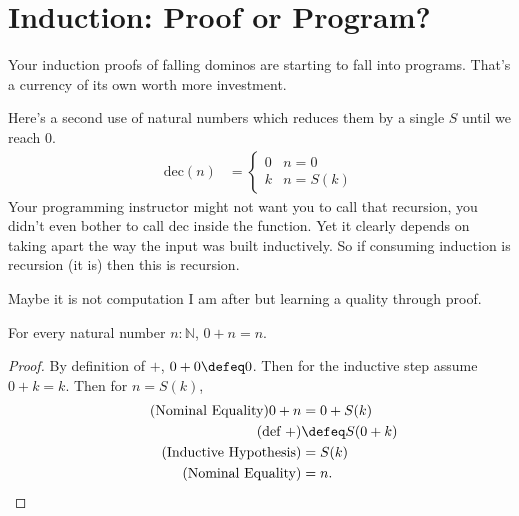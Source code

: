 

\section{Induction: Proof or Program?}
Your induction proofs of falling dominos are starting to fall into programs.
That's a currency of its own worth more investment.

Here's a second use of natural numbers which reduces them by a single $S$ until we reach $0$.
\begin{align*}
    \text{dec}(n) & =\begin{cases}
        0 & n=0\\
        k & n=S(k)
    \end{cases}
\end{align*}
Your programming instructor might not want you to call that recursion, you didn't 
even bother to call $\text{dec}$ inside the function.  Yet it clearly 
depends on taking apart the way the input was built inductively.  So if 
consuming induction is recursion (it is) then this is recursion.

Maybe it is not computation I am after but learning a quality through proof.

\begin{proposition}
    For every natural number $n:\mathbb{N}$, $0+n=n$.
\end{proposition}
\begin{proof}
    By definition of $+$, $0+0\defeq 0$.
    Then for the inductive step assume 
    $0+k=k$.  Then for $n=S(k)$, 
    \begin{align*}
        \tag{Nominal Equality}
        0+n & = 0+S(k)\\
        \tag{def $+$}
        & \defeq S(0+k)\\
        \tag{Inductive Hypothesis}
        & =S(k)\\
        \tag{Nominal Equality}
        & =n.
\end{align*}
\end{proof}

